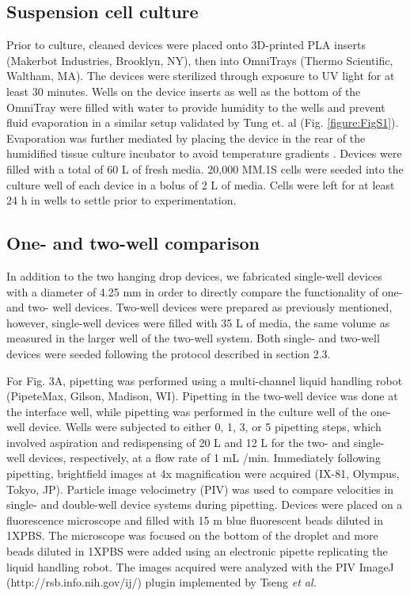 \subsection{Suspension cell culture}
Prior to culture, cleaned devices were placed onto 3D-printed PLA inserts (Makerbot Industries, Brooklyn, NY), then into OmniTrays (Thermo Scientific, Waltham, MA). The devices were sterilized through exposure to UV light for at least 30 minutes. Wells on the device inserts as well as the bottom of the OmniTray were filled with water to provide humidity to the wells and prevent fluid evaporation in a similar setup validated by Tung et. al \cite{Tung2011} (Fig. \ref{figure:FigS1}). Evaporation was further mediated by placing the device in the rear of the humidified tissue culture incubator to avoid temperature gradients \cite{Berthier2008}. Devices were filled with a total of 60 \textmu L of fresh media. 20,000 MM.1S cells were seeded into the culture well of each device in a bolus of 2 \textmu L of media. Cells were left for at least 24 h in wells to settle prior to experimentation.  

\subsection{One- and two-well comparison}
In addition to the two hanging drop devices, we fabricated single-well devices with a diameter of 4.25 mm in order to directly compare the functionality of one- and two- well devices. Two-well devices were prepared as previously mentioned, however, single-well devices were filled with 35 \textmu L of media, the same volume as measured in the larger well of the two-well system. Both single- and two-well devices were seeded following the protocol described in section 2.3. 

For Fig. 3A, pipetting was performed using a multi-channel liquid handling robot (PipeteMax, Gilson, Madison, WI). Pipetting in the two-well device was done at the interface well, while pipetting was performed in the culture well of the one-well device. Wells were subjected to either 0, 1, 3, or 5 pipetting steps, which involved aspiration and redispensing of 20 \textmu L and 12 \textmu L for the two- and single- well devices, respectively, at a flow rate of 1 mL /min. Immediately following pipetting, brightfield images at 4x magnification were acquired (IX-81, Olympus, Tokyo, JP).
Particle image velocimetry (PIV) was used to compare velocities in single- and double-well device systems during pipetting. Devices were placed on a fluorescence microscope and filled with 15 m blue fluorescent beads diluted in 1XPBS. The microscope was focused on the bottom of the droplet and more beads diluted in 1XPBS were added using an electronic pipette replicating the liquid handling robot. The images acquired were analyzed with the PIV ImageJ (http://rsb.info.nih.gov/ij/) plugin implemented by Tseng \textit{et al.}  \cite{Tseng2012}

